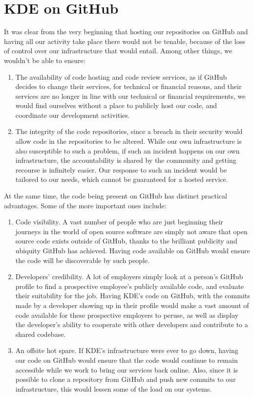 \section*{KDE on GitHub}
It was clear from the very beginning that hosting our repositories on GitHub and having all our activity take place there would not be tenable, because of the loss of control over our infrastructure that would entail. Among other things, we wouldn't be able to ensure:
\begin{enumerate}
 \item The availability of code hosting and code review services, as if GitHub decides to change their services, for technical or financial reasons, and their services are no longer in line with our technical or financial requirements, we would find ourselves without a place to publicly host our code, and coordinate our development activities.
 \item The integrity of the code repositories, since a breach in their security would allow code in the repositories to be altered. While our own infrastructure is also susceptible to such a problem, if such an incident happens on our own infrastructure, the accountability is shared by the community and getting recourse is infinitely easier. Our response to such an incident would be tailored to our needs, which cannot be guaranteed for a hosted service.
\end{enumerate}
At the same time, the code being present on GitHub has distinct practical advantages. Some of the more important ones include:
\begin{enumerate}
 \item Code visibility. A vast number of people who are just beginning their journeys in the world of open source software are simply not aware that open source code exists outside of GitHub, thanks to the brilliant publicity and ubiquity GitHub has achieved. Having code available on GitHub would ensure the code will be discoverable by such people.
 \item Developers’ credibility. A lot of employers simply look at a person's GitHub profile to find a prospective employee's publicly available code, and evaluate their suitability for the job. Having KDE's code on GitHub, with the commits made by a developer showing up in their profile would make a vast amount of code available for these prospective employers to peruse, as well as display the developer's ability to cooperate with other developers and contribute to a shared codebase.
 \item An offsite hot spare. If KDE's infrastructure were ever to go down, having our code on GitHub would ensure that the code would continue to remain accessible while we work to bring our services back online. Also, since it is possible to clone a repository from GitHub and push new commits to our infrastructure, this would lessen some of the load on our systems.
\end{enumerate}

